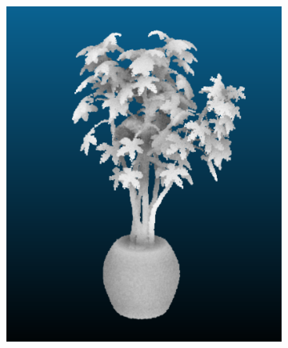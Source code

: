 \documentclass{article}
\begin{document}
\begin{figure}[!h]
\begin{subfigure}{.24\textwidth}
\end{subfigure}
\begin{subfigure}{.24\textwidth}
  \centering
  \includegraphics[width=\linewidth]{figs/carve/ficus.png}  
\end{subfigure}
\begin{subfigure}{.24\textwidth}
  \centering

\end{subfigure}
\end{figure}
\end{document}
